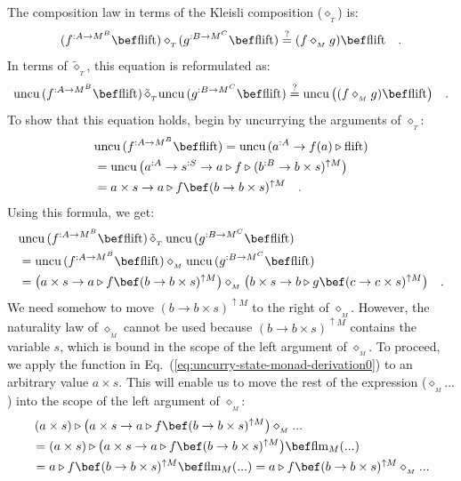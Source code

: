 The composition law in terms of the Kleisli composition ($\diamond_{_{T}}$)
is:
\[
(f^{:A\rightarrow M^{B}}\bef\text{flift})\diamond_{_{T}}\!(g^{:B\rightarrow M^{C}}\bef\text{flift})\overset{?}{=}(f\diamond_{_{M}}g)\bef\text{flift}\quad.
\]
In terms of $\tilde{\diamond}_{_{T}}$, this equation is reformulated
as:
\[
\text{uncu}\,(f^{:A\rightarrow M^{B}}\bef\text{flift})\,\tilde{\diamond}_{_{T}}\text{uncu}\,(g^{:B\rightarrow M^{C}}\bef\text{flift})\overset{?}{=}\text{uncu}\,\big((f\diamond_{_{M}}g)\bef\text{flift}\big)\quad.
\]
To show that this equation holds, begin by uncurrying the arguments
of $\diamond_{_{T}}$:
\begin{align*}
 & \text{uncu}\,(f^{:A\rightarrow M^{B}}\bef\text{flift})=\text{uncu}\,(a^{:A}\rightarrow f(a)\triangleright\text{flift})\\
 & =\text{uncu}\,\big(a^{:A}\rightarrow s^{:S}\rightarrow a\triangleright f\triangleright(b^{:B}\rightarrow b\times s)^{\uparrow M}\big)\\
 & =a\times s\rightarrow a\triangleright f\bef(b\rightarrow b\times s)^{\uparrow M}\quad.
\end{align*}
Using this formula, we get:
\begin{align}
 & \text{uncu}\,(f^{:A\rightarrow M^{B}}\bef\text{flift})\,\tilde{\diamond}_{_{T}}\,\text{uncu}\,(g^{:B\rightarrow M^{C}}\bef\text{flift})\nonumber \\
 & =\text{uncu}\,(f^{:A\rightarrow M^{B}}\bef\text{flift})\diamond_{_{M}}\text{uncu}\,(g^{:B\rightarrow M^{C}}\bef\text{flift})\nonumber \\
 & =\big(a\times s\rightarrow a\triangleright f\bef(b\rightarrow b\times s)^{\uparrow M}\big)\diamond_{_{M}}\big(b\times s\rightarrow b\triangleright g\bef(c\rightarrow c\times s)^{\uparrow M}\big)\quad.\label{eq:uncurry-state-monad-derivation0}
\end{align}
We need somehow to move $(b\rightarrow b\times s)^{\uparrow M}$ to
the right of $\diamond_{_{M}}$. However, the naturality law of $\diamond_{_{M}}$
cannot be used because $(b\rightarrow b\times s)^{\uparrow M}$ contains
the variable $s$, which is bound in the scope of the left argument
of $\diamond_{_{M}}$. To proceed, we apply the function in Eq.~(\ref{eq:uncurry-state-monad-derivation0})
to an arbitrary value $a\times s$. This will enable us to move the
rest of the expression ($\diamond_{_{M}}...$) into the scope of the
left argument of $\diamond_{_{M}}$:
\begin{align*}
 & \left(a\times s\right)\triangleright\big(a\times s\rightarrow a\triangleright f\bef(b\rightarrow b\times s)^{\uparrow M}\big)\diamond_{_{M}}...\\
 & =\left(a\times s\right)\triangleright\big(a\times s\rightarrow a\triangleright f\bef(b\rightarrow b\times s)^{\uparrow M}\big)\bef\text{flm}_{M}(...)\\
 & =a\triangleright f\bef(b\rightarrow b\times s)^{\uparrow M}\bef\text{flm}_{M}(...)=a\triangleright f\bef(b\rightarrow b\times s)^{\uparrow M}\diamond_{_{M}}...
\end{align*}
